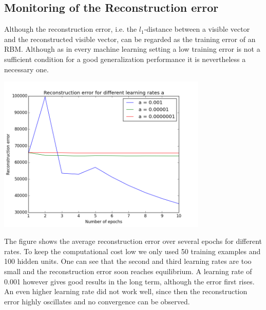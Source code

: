 \documentclass[a4paper]{scrartcl}
\begin{document}
\subsection{Monitoring of the Reconstruction error}
Although the reconstruction error, i.e. the $l_1$-distance between a visible vector and the reconstructed visible vector, can be regarded as the training error of an RBM. Although as in every machine learning setting a low training error is not a sufficient condition for a good generalization performance it is nevertheless a necessary one.
\begin{center}
\includegraphics[width=10cm]{images/cifarreconerr.png}
\end{center} 
The figure shows the average reconstruction error over several epochs for different rates.  To keep the computational cost low we only used 50 training examples and 100 hidden units. One can see that the second and third learning rates are too small and the reconstruction error soon reaches equilibrium. A learning rate of 0.001 however gives good results in the long term, although the error first rises. An even higher learning rate did not work well, since then the reconstruction error highly oscillates and no convergence can be observed. 
\end{document}
